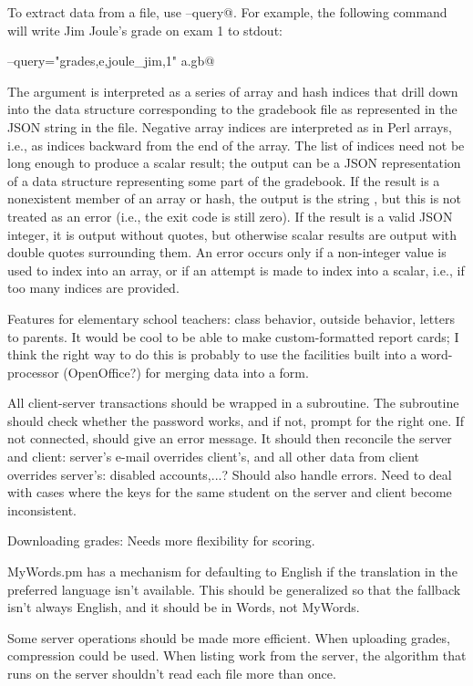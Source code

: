 \documentclass{opengrade_doc}
\begin{document}
To extract data from a file, use \verb@--query@. For example, the following
command will write
Jim Joule's grade on exam 1 to stdout:

\verb@opengrade --query="grades,e,joule_jim,1" a.gb@

The argument is interpreted as a series of array and hash indices
that drill down into the data structure corresponding to the gradebook
file as represented in the JSON string in the file. Negative array indices
are interpreted as in Perl arrays, i.e., as indices backward from the end
of the array. The list of indices need not be long enough to produce a
scalar result; the output can be a JSON representation of a data structure
representing some part of the gradebook. If the result is a nonexistent member
of an array or hash,
the output is the string \verb@null@, but this is not treated as an error
(i.e., the exit code is still zero). If the result is a valid JSON
integer, it is output without quotes, but otherwise scalar results
are output with double quotes surrounding them. An error occurs only if
a non-integer value is used to index into an array, or if an attempt
is made to index into a scalar, i.e., if too many indices are provided.

\label{improve}
Features for elementary school teachers: class behavior, outside behavior,
letters to parents.
It would be cool to be able to make custom-formatted report cards; I think
the right way to do this is probably to use the facilities built into
a word-processor (OpenOffice?)
for merging data into a form.

All client-server transactions should be wrapped in a subroutine. The
subroutine should check whether the password works, and if not, prompt
for the right one. If not connected, should give an error message.
It should then reconcile the server and client:
server's e-mail overrides client's, and all other data from client
overrides server's: disabled accounts,...? Should also handle errors.
Need to deal with cases where the keys for the same student on the server
and client become inconsistent.

Downloading grades: Needs more flexibility
for scoring.

MyWords.pm has a mechanism for defaulting to English if the translation
in the preferred language isn't available. This should be generalized
so that the fallback isn't always English, and it should be in
Words, not MyWords.

Some server operations should be made more efficient. When uploading
grades, compression could be used. When listing work from the server,
the algorithm that runs on the server shouldn't read each file more
than once.
\end{document}
